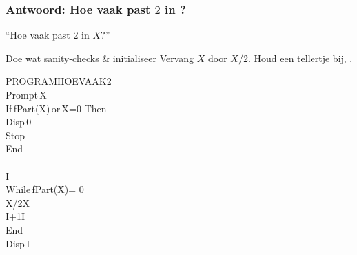 \begin{frame}
\frametitle{Antwoord: Hoe vaak past $2$ in ?}

\vspace{-0.5cm}
\hspace{-1cm}
\begin{minipage}{0.8\textwidth}
	\begin{algorithm}[H]
	\caption{``Hoe vaak past 2 in $X$?''}
	\begin{algorithmic}[1]
	  \State Doe wat sanity-checks \& initialiseer
	    \State Vervang $X$ door $X/2$.
	    \State Houd een tellertje bij, .
	  \EndWhile
	\EndFunction
	\end{algorithmic}
	\end{algorithm}
\end{minipage}
\begin{minipage}{0.15\textwidth}%
\begin{ticalc}
	PROGRAM\:HOEVAAK2\\%
	\:Prompt\,X\\%
	\:If\,fPart(X)\,or\,X=0
	\:Then\\%
	\:Disp\,0\\%
	\:Stop\\%
	\:End\\%
	\:\\%
	\:\>I\\%
	\:While\,fPart(X)= 0\\%
	\:X/2\>X\\%
	\:I+1\>I\\%
	\:End\\%
	\:Disp\,I
\end{ticalc}
\end{minipage}

\end{frame}




